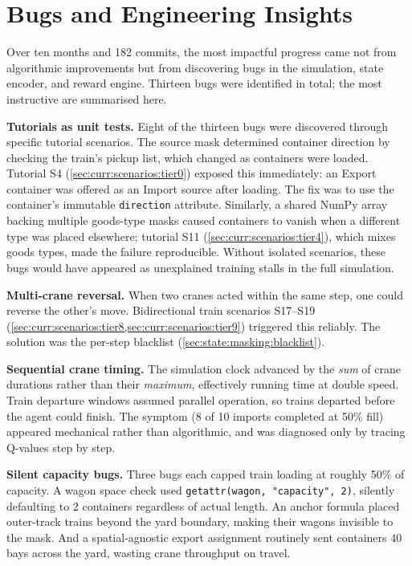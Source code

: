 \section{Bugs and Engineering Insights}
\label{sec:disc:engineering}

Over ten months and 182 commits, the most impactful progress came not from algorithmic improvements but from discovering bugs in the simulation, state encoder, and reward engine. Thirteen bugs were identified in total; the most instructive are summarised here.

\textbf{Tutorials as unit tests.} Eight of the thirteen bugs were discovered through specific tutorial scenarios. The source mask determined container direction by checking the train's pickup list, which changed as containers were loaded. Tutorial S4 (\cref{sec:curr:scenarios:tier0}) exposed this immediately: an Export container was offered as an Import source after loading. The fix was to use the container's immutable \texttt{direction} attribute. Similarly, a shared NumPy array backing multiple goods-type masks caused containers to vanish when a different type was placed elsewhere; tutorial S11 (\cref{sec:curr:scenarios:tier4}), which mixes goods types, made the failure reproducible. Without isolated scenarios, these bugs would have appeared as unexplained training stalls in the full simulation.

\textbf{Multi-crane reversal.} When two cranes acted within the same step, one could reverse the other's move. Bidirectional train scenarios S17--S19 (\cref{sec:curr:scenarios:tier8,sec:curr:scenarios:tier9}) triggered this reliably. The solution was the per-step blacklist (\cref{sec:state:masking:blacklist}).

\textbf{Sequential crane timing.} The simulation clock advanced by the \emph{sum} of crane durations rather than their \emph{maximum}, effectively running time at double speed. Train departure windows assumed parallel operation, so trains departed before the agent could finish. The symptom (8 of 10 imports completed at 50\% fill) appeared mechanical rather than algorithmic, and was diagnosed only by tracing Q-values step by step.

\textbf{Silent capacity bugs.} Three bugs each capped train loading at roughly 50\% of capacity. A wagon space check used \texttt{getattr(wagon, "capacity", 2)}, silently defaulting to 2 containers regardless of actual length. An anchor formula placed outer-track trains beyond the yard boundary, making their wagons invisible to the mask. And a spatial-agnostic export assignment routinely sent containers 40 bays across the yard, wasting crane throughput on travel.

